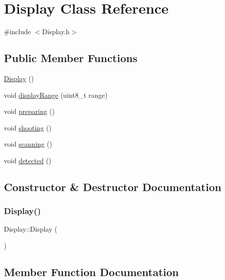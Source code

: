 \hypertarget{class_display}{}\section{Display Class Reference}
\label{class_display}


{\ttfamily \#include $<$Display.\+h$>$}

\subsection*{Public Member Functions}
\begin{DoxyCompactItemize}
\item 
\hyperlink{class_display_ae972fffea6f7ca1d627ef48c3d841bb3}{Display} ()
\item 
void \hyperlink{class_display_a17b2c33591506754e00487cf24e82e8d}{display\+Range} (uint8\+\_\+t range)
\item 
void \hyperlink{class_display_afe748da9597c76a9e1e2cf663b7c9b9e}{preparing} ()
\item 
void \hyperlink{class_display_ab36a436c95c76efa0ad1bd023e92ec48}{shooting} ()
\item 
void \hyperlink{class_display_ae078e2aed9366db1ec8c8835d80a39ac}{scanning} ()
\item 
void \hyperlink{class_display_aeab4e2dea18fc98dae070aebb5cf2fe1}{detected} ()
\end{DoxyCompactItemize}


\subsection{Constructor \& Destructor Documentation}
\mbox{\label{class_display_ae972fffea6f7ca1d627ef48c3d841bb3}} 
\subsubsection{\texorpdfstring{Display()}{Display()}}
{\footnotesize\ttfamily Display\+::\+Display (\begin{DoxyParamCaption}{ }\end{DoxyParamCaption})}



\subsection{Member Function Documentation}
\mbox{\label{class_display_aeab4e2dea18fc98dae070aebb5cf2fe1}} 

